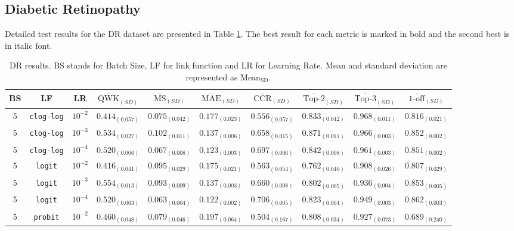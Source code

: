 \documentclass[journal]{IEEEtran}
\begin{document}
	\subsection{Diabetic Retinopathy}
	\label{sect:dr}
	Detailed test results for the DR dataset are presented in Table \ref{table:DRresults}. The best result for each metric is marked in bold and the second best is in italic font.
	
	\begin{table}[!t]
		\caption{DR results. BS stands for Batch Size, LF for link function and LR for Learning Rate. Mean and standard deviation are represented as $\text{Mean}_\text{SD}$.}
		\label{table:DRresults}
		\footnotesize
		\centering
		\begin{tabular}{c@{\hskip 0.15cm}c@{\hskip 0.15cm}c@{\hskip 0.15cm}c@{\hskip 0.30cm}c@{\hskip 0.20cm}c@{\hskip 0.20cm}c@{\hskip 0.20cm}c@{\hskip 0.20cm}c@{\hskip 0.20cm}c}
			\hline
			\hline
			BS & LF & LR & $\overline{\text{QWK}}_{{(SD)}}$ & $\overline{\text{MS}}_{{(SD)}}$ & $\overline{\text{MAE}}_{{(SD)}}$ & $\overline{\text{CCR}}_{{(SD)}}$ & $\overline{\text{Top-2}}_{{(SD)}}$ & $\overline{\text{Top-3}}_{{(SD)}}$ & $\overline{\text{1-off}}_{{(SD)}}$\\\hline
			5 & \texttt{clog-log} & $10^{-2}$ & $0.414_{(0.057)}$ & $0.075_{(0.042)}$ & $0.177_{(0.023)}$ & $0.556_{(0.057)}$ & $0.833_{(0.042)}$ & $0.968_{(0.011)}$ & $0.816_{(0.021)}$\\
			5 & \texttt{clog-log} & $10^{-3}$ & $0.534_{(0.027)}$ & $0.102_{(0.011)}$ & $0.137_{(0.006)}$ & $0.658_{(0.015)}$ & $0.871_{(0.011)}$ & $0.966_{(0.003)}$ & $0.852_{(0.002)}$\\
			5 & \texttt{clog-log} & $10^{-4}$ & $0.520_{(0.006)}$ & $0.067_{(0.008)}$ & $0.123_{(0.003)}$ & $0.697_{(0.006)}$ & $0.842_{(0.008)}$ & $0.961_{(0.003)}$ & $0.851_{(0.002)}$\\
			5 & \texttt{logit} & $10^{-2}$ & $0.416_{(0.041)}$ & $0.095_{(0.029)}$ & $0.175_{(0.021)}$ & $0.563_{(0.054)}$ & $0.762_{(0.040)}$ & $0.908_{(0.026)}$ & $0.807_{(0.029)}$\\
			5 & \texttt{logit} & $10^{-3}$ & $0.554_{(0.013)}$ & $0.093_{(0.009)}$ & $0.137_{(0.003)}$ & $0.660_{(0.008)}$ & $0.802_{(0.005)}$ & $0.936_{(0.004)}$ & $0.853_{(0.005)}$\\
			5 & \texttt{logit} & $10^{-4}$ & $0.520_{(0.003)}$ & $0.063_{(0.004)}$ & $0.122_{(0.002)}$ & $0.706_{(0.005)}$ & $0.823_{(0.004)}$ & $0.949_{(0.003)}$ & $0.862_{(0.003)}$\\
			5 & \texttt{probit} & $10^{-2}$ & $0.460_{(0.048)}$ & $0.079_{(0.046)}$ & $0.197_{(0.064)}$ & $0.504_{(0.167)}$ & $0.808_{(0.034)}$ & $0.927_{(0.073)}$ & $0.689_{(0.240)}$\\

\end{tabular}
\end{table}
\end{document}
